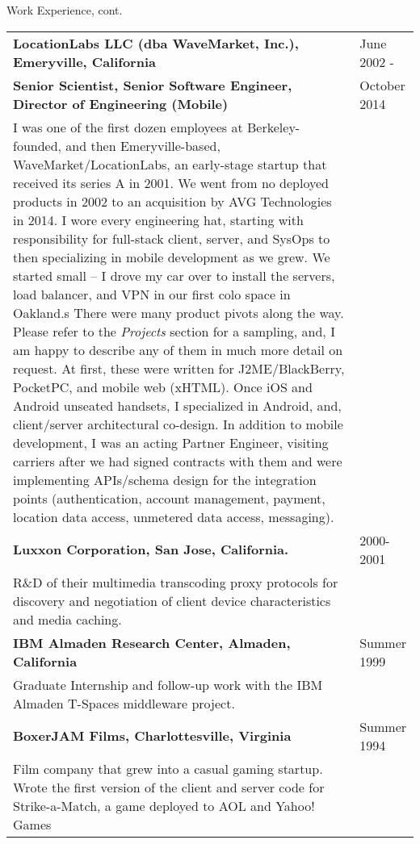 \newpage
\begin{bf} \large
Work Experience, cont.
\end{bf}
\medskip

\begin{tabular}{p{5.2in}@{\hspace{1.5cm}}l}
	  
	\bf  LocationLabs LLC (dba WaveMarket, Inc.), Emeryville, California    & June 2002 -  \\
	\bf  Senior Scientist, Senior Software Engineer, Director of Engineering (Mobile) & October 2014 \\[4pt]
	
	   I was one of the first dozen employees at Berkeley-founded, and then Emeryville-based, 
	   WaveMarket/LocationLabs,
	   an early-stage startup that received its series A in 2001.
	   We went from no deployed products in 2002 to an
	   acquisition by AVG Technologies in 2014.  I wore every engineering hat, starting with responsibility
	   for full-stack client, server, and SysOps to
	   then specializing in mobile development as we grew.  
	   We started small -- 
	   I drove my car over to install the servers, load balancer, and VPN in our first colo space in Oakland.s
	   There were many product pivots along the way. Please refer to the {\it Projects} section for a sampling, 
	   and, I am happy to describe any of them in much more detail on request.
	   At first, these were written for J2ME/BlackBerry, PocketPC, and mobile web (xHTML).
	   Once iOS and Android unseated handsets, 
	   I specialized in Android, and, client/server architectural co-design.  In addition to mobile development, I was an acting
	   Partner Engineer, visiting carriers after we had signed contracts
	   with them and were implementing APIs/schema design for the integration points
	    (authentication, account management, payment, location data access, unmetered data access, messaging). \\[9pt]
       	  
    \bf Luxxon Corporation, San Jose, California. & 2000-2001 \\[3pt]
       R\&D of their multimedia transcoding proxy
       protocols for discovery and negotiation of client
       device characteristics and media caching. \\[9pt]

    \bf IBM Almaden Research Center, 
          Almaden, California                         & Summer 1999 \\[3pt]
       Graduate Internship and follow-up work with
       the IBM Almaden T-Spaces middleware project. \\[9pt]

    \bf BoxerJAM Films, 
         Charlottesville, Virginia                        & Summer 1994 \\[3pt]
       Film company that grew into a casual gaming startup. 
       Wrote the first version of the client and server code for Strike-a-Match, 
       a game deployed to AOL and Yahoo! Games \\[9pt]

\end{tabular}


